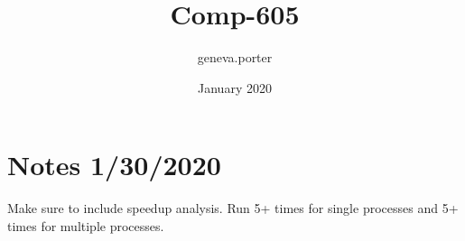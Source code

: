 \documentclass{article}
\title{Comp-605}
\author{geneva.porter }
\date{January 2020}
\begin{document}
\maketitle

\section{Notes 1/30/2020}
\begin{list}
    \item Make sure to include speedup analysis. Run 5+ times for single processes and 5+ times for multiple processes.
    \item 
\end{list}
\end{document}
